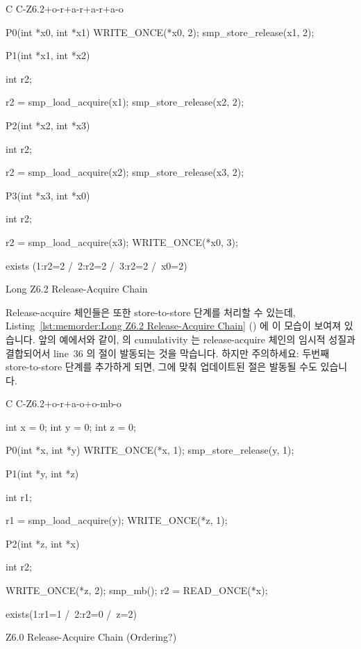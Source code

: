 \begin{listing}[tbp]
{ \scriptsize
\begin{verbbox}[\LstLineNo]
C C-Z6.2+o-r+a-r+a-r+a-o
{
}

P0(int *x0, int *x1)
{
  WRITE_ONCE(*x0, 2);
  smp_store_release(x1, 2);
}


P1(int *x1, int *x2)
{
  int r2;

  r2 = smp_load_acquire(x1);
  smp_store_release(x2, 2);
}

P2(int *x2, int *x3)
{
  int r2;

  r2 = smp_load_acquire(x2);
  smp_store_release(x3, 2);
}

P3(int *x3, int *x0)
{
  int r2;

  r2 = smp_load_acquire(x3);
  WRITE_ONCE(*x0, 3);
}

exists (1:r2=2 /\ 2:r2=2 /\ 3:r2=2 /\ x0=2)
\end{verbbox}
}
\centering
\theverbbox
\caption{Long Z6.2 Release-Acquire Chain}
\label{lst:memorder:Long Z6.2 Release-Acquire Chain}
\end{listing}

Release-acquire 체인들은 또한 store-to-store 단계를 처리할 수 있는데,
Listing~\ref{lst:memorder:Long Z6.2 Release-Acquire Chain}
()
에 이 모습이 보여져 있습니다.
앞의 예에서와 같이,  의 cumulativity 는 release-acquire
체인의 임시적 성질과 결합되어서 line~36 의  절이 발동되는 것을
막습니다.
하지만 주의하세요: 두번째 store-to-store 단계를 추가하게 되면, 그에 맞춰
업데이트된  절은 발동될 수도 있습니다.

\begin{listing}[tbp]
{ \scriptsize
\begin{verbbox}[\LstLineNo]
C C-Z6.2+o-r+a-o+o-mb-o

{
int x = 0;
int y = 0;
int z = 0;
}

P0(int *x, int *y)
{
  WRITE_ONCE(*x, 1);
  smp_store_release(y, 1);
}

P1(int *y, int *z)
{
  int r1;

  r1 = smp_load_acquire(y);
  WRITE_ONCE(*z, 1);
}

P2(int *z, int *x)
{
  int r2;

  WRITE_ONCE(*z, 2);
  smp_mb();
  r2 = READ_ONCE(*x);
}

exists(1:r1=1 /\ 2:r2=0 /\ z=2)
\end{verbbox}
}
\centering
\theverbbox
\caption{Z6.0 Release-Acquire Chain (Ordering?)}
\label{lst:memorder:Z6.0 Release-Acquire Chain (Ordering?)}
\end{listing}

